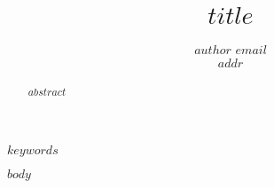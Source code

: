 \documentclass[twoside,11pt,preprint]{article}
\begin{document}
\title{$title$}

\author{\name $author$ \email $email$\\
       \addr $addr$
       }

\editor{}

\maketitle

\begin{abstract}%
$abstract$
\end{abstract}

\begin{keywords}
  $keywords$
\end{keywords}

$body$

\vskip 0.2in

\end{document}
